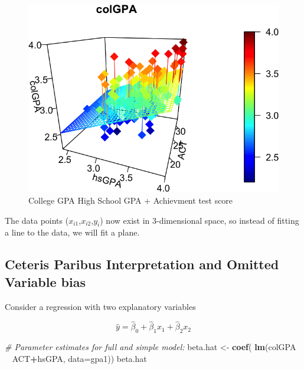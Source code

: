 \documentclass[]{book}
\newenvironment{Shaded}{\begin{snugshade}}{\end{snugshade}}
\newcommand{\CommentTok}[1]{\textcolor[rgb]{0.56,0.35,0.01}{\textit{#1}}}
\newcommand{\DataTypeTok}[1]{\textcolor[rgb]{0.13,0.29,0.53}{#1}}
\newcommand{\KeywordTok}[1]{\textcolor[rgb]{0.13,0.29,0.53}{\textbf{#1}}}
\newcommand{\NormalTok}[1]{#1}
\newcommand{\OperatorTok}[1]{\textcolor[rgb]{0.81,0.36,0.00}{\textbf{#1}}}
\newcommand{\StringTok}[1]{\textcolor[rgb]{0.31,0.60,0.02}{#1}}
\begin{document}
\begin{figure}

{\centering \includegraphics[width=0.8\linewidth]{MEM5220_R_files/figure-latex/fig16-1} 

}

\caption{College GPA  High School GPA + Achievment test score}\label{fig:fig16}
\end{figure}

The data points (\(x_{i1}\),\(x_{i2}\),\(y_{i}\)) now exist in 3-dimensional space, so instead of fitting a line to the data, we will fit a plane.

\hypertarget{ceteris-paribus-interpretation-and-omitted-variable-bias}{%
\subsection{Ceteris Paribus Interpretation and Omitted Variable bias}\label{ceteris-paribus-interpretation-and-omitted-variable-bias}}

Consider a regression with two explanatory variables

\begin{equation}
\hat{y} = \hat{\beta}_{0} + \hat{\beta}_{1}x_{1} +  \hat{\beta}_{2}x_{2}    
\label{eq:lmtwoexplanatory}
\end{equation}

\begin{Shaded}
\begin{Highlighting}[]
\CommentTok{# Parameter estimates for full and simple model:}
\NormalTok{beta.hat <-}\StringTok{ }\KeywordTok{coef}\NormalTok{( }\KeywordTok{lm}\NormalTok{(colGPA }\OperatorTok{~}\StringTok{ }\NormalTok{ACT}\OperatorTok{+}\NormalTok{hsGPA, }\DataTypeTok{data=}\NormalTok{gpa1))}
\NormalTok{beta.hat}
\end{Highlighting}
\end{Shaded}
\end{document}
